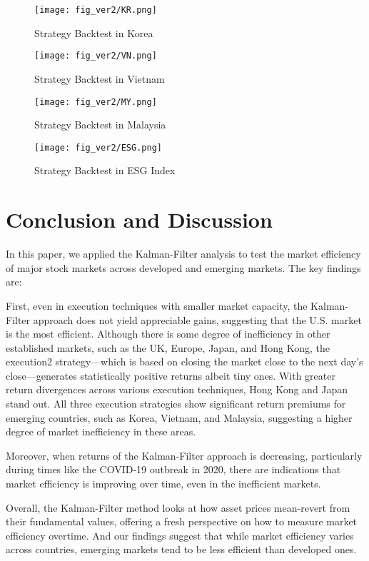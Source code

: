 \begin{figure}[H]
    \centering
    \texttt{[image: fig\_ver2/KR.png]}
    \caption{Strategy Backtest in Korea}
    \label{fig:kr}
\end{figure}
\begin{figure}[H]
    \centering
    \texttt{[image: fig\_ver2/VN.png]}
    \caption{Strategy Backtest in Vietnam}
    \label{fig:vn}
\end{figure}
\begin{figure}[H]
    \centering
    \texttt{[image: fig\_ver2/MY.png]}
    \caption{Strategy Backtest in Malaysia}
    \label{fig:my}
\end{figure}
\begin{figure}[H]
    \centering
    \texttt{[image: fig\_ver2/ESG.png]}
    \caption{Strategy Backtest in ESG Index}
    \label{fig:esg}
\end{figure}

\section{Conclusion and Discussion}

In this paper, we applied the Kalman-Filter analysis to test the market efficiency of major stock markets across developed and emerging markets. The key findings are:

First, even in execution techniques with smaller market capacity, the Kalman-Filter approach does not yield appreciable gains, suggesting that the U.S. market is the most efficient. Although there is some degree of inefficiency in other established markets, such as the UK, Europe, Japan, and Hong Kong, the execution2 strategy—which is based on closing the market close to the next day's close—generates statistically positive returns albeit tiny ones. With greater return divergences across various execution techniques, Hong Kong and Japan stand out. All three execution strategies show significant return premiums for emerging countries, such as Korea, Vietnam, and Malaysia, suggesting a higher degree of market inefficiency in these areas.

Moreover, when returns of the Kalman-Filter approach is decreasing, particularly during times like the COVID-19 outbreak in 2020, there are indications that market efficiency is improving over time, even in the inefficient markets.

Overall, the Kalman-Filter method looks at how asset prices mean-revert from their fundamental values, offering a fresh perspective on how to measure market efficiency overtime. And our findings suggest that while market efficiency varies across countries, emerging markets tend to be less efficient than developed ones.

